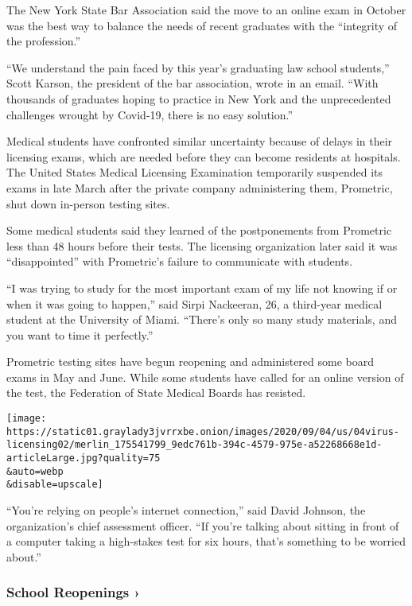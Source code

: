 The New York State Bar Association said the move to an online exam in
October was the best way to balance the needs of recent graduates with
the ``integrity of the profession.''

``We understand the pain faced by this year's graduating law school
students,'' Scott Karson, the president of the bar association, wrote in
an email. ``With thousands of graduates hoping to practice in New York
and the unprecedented challenges wrought by Covid-19, there is no easy
solution.''

Medical students have confronted similar uncertainty because of delays
in their licensing exams, which are needed before they can become
residents at hospitals. The United States Medical Licensing Examination
temporarily suspended its exams in late March after the private company
administering them, Prometric, shut down in-person testing sites.

Some medical students said they learned of the postponements from
Prometric less than 48 hours before their tests. The licensing
organization later said it was ``disappointed'' with Prometric's failure
to communicate with students.

``I was trying to study for the most important exam of my life not
knowing if or when it was going to happen,'' said Sirpi Nackeeran, 26, a
third-year medical student at the University of Miami. ``There's only so
many study materials, and you want to time it perfectly.''

Prometric testing sites have begun reopening and administered some board
exams in May and June. While some students have called for an online
version of the test, the Federation of State Medical Boards has
resisted.

\texttt{[image: https://static01.graylady3jvrrxbe.onion/images/2020/09/04/us/04virus-licensing02/merlin\_175541799\_9edc761b-394c-4579-975e-a52268668e1d-articleLarge.jpg?quality=75\\\&auto=webp\\\&disable=upscale]}

``You're relying on people's internet connection,'' said David Johnson,
the organization's chief assessment officer. ``If you're talking about
sitting in front of a computer taking a high-stakes test for six hours,
that's something to be worried about.''

\href{https://www.nytimes3xbfgragh.onion/spotlight/schools-reopening?action=click\&pgtype=Article\&state=default\&region=MAIN_CONTENT_3\&context=storylines_keepup}{}

\hypertarget{school-reopenings-}{%
\subsubsection{School Reopenings ›}\label{school-reopenings-}}

